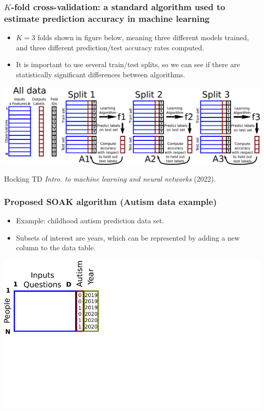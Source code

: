 \documentclass[t]{beamer}
\begin{document}
\begin{frame}
  \frametitle{$K$-fold cross-validation: a standard algorithm used to estimate prediction accuracy in machine learning}

  \begin{itemize}
  \item $K=3$ folds shown in figure below, meaning three different
    models trained, and three different prediction/test accuracy rates
    computed.
  \item It is important to use several train/test splits, so we can
    see if there are statistically significant differences between
    algorithms.
  \end{itemize}

  \includegraphics[width=\textwidth]{drawing-cross-validation.pdf}

  \small Hocking TD \emph{Intro. to machine learning and neural
    networks} (2022).
\end{frame}


\begin{frame}
  \frametitle{Proposed SOAK algorithm (Autism data example)}
  \begin{itemize}
  \item Example: childhood autism prediction data set.
  \item Subsets of interest are years, which can be represented by
    adding a new column to the data table.
  \end{itemize}
  \includegraphics[width=\textwidth]{drawing-cv-same-other-years-1.pdf}
\end{frame}
\end{document}
